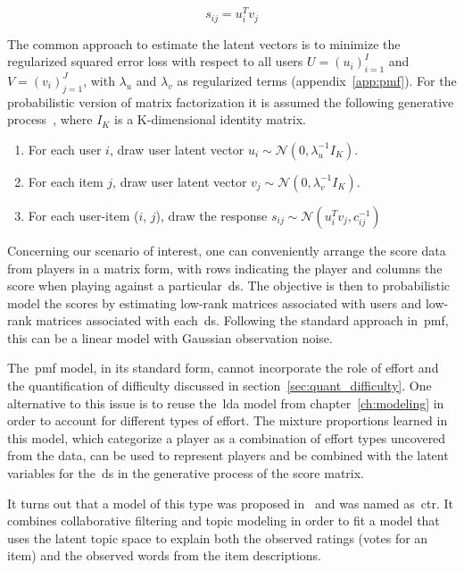\begin{equation}
    s_{ij} = u_{i}^{T}v_{j}
\end{equation}

The common approach to estimate the latent vectors is to minimize the regularized squared error loss with respect to all users $U=(u_{i})_{i=1}^{I}$ and $V=(v_{i})_{j=1}^{J}$, with $\lambda_{u}$ and $\lambda_{v}$ as regularized terms (appendix~\ref{app:pmf}). For the probabilistic version of matrix factorization it is assumed the following generative process~\citep{wang_collaborative_2011}, where $I_{K}$ is a K-dimensional identity matrix.

\begin{enumerate}
    \item For each user $i$, draw user latent vector $u_{i} \sim \mathcal{N}(0,\lambda_{u}^{-1}I_{K})$.
    \item For each item $j$, draw user latent vector $v_{j} \sim \mathcal{N}(0,\lambda_{v}^{-1}I_{K})$.
    \item For each user-item ($i$, $j$), draw the response $s_{ij} \sim \mathcal{N}(u_{i}^{T}v_{j}, c_{ij}^{-1})$
\end{enumerate}


Concerning our scenario of interest, one can conveniently arrange the score data from players in a matrix form, with rows indicating the player and columns the score when playing against a particular~\gls{ds}. The objective is then to probabilistic model the scores by estimating low-rank matrices associated with users and low-rank matrices associated with each~\gls{ds}.
Following the standard approach in~\gls{pmf}, this can be a linear model with Gaussian observation noise. 

The~\gls{pmf} model, in its standard form, cannot incorporate the role of effort and the quantification of difficulty discussed in section~\ref{sec:quant_difficulty}. One alternative to this issue is to reuse the~\gls{lda} model from chapter~\ref{ch:modeling} in order to account for different types of effort. The mixture proportions learned in this model, which categorize a player as a combination of effort types uncovered from the data, can be used to represent players and be combined with the latent variables for the~\gls{ds} in the generative process of the score matrix.

It turns out that a model of this type was proposed in~\cite{wang_collaborative_2011} and was named as~\gls{ctr}. It combines collaborative filtering and topic modeling in order to fit a model that uses the latent topic space to explain both the observed ratings (votes for an item) and the observed words from the item descriptions. 

